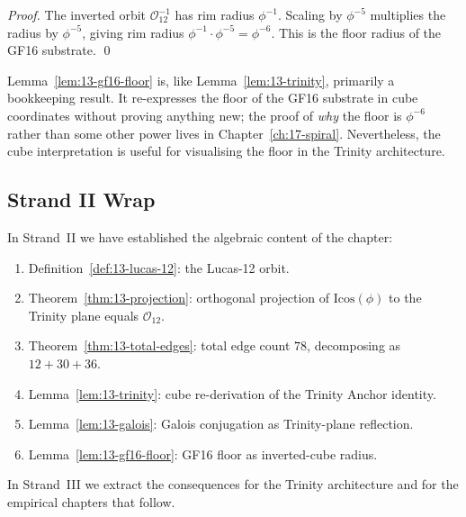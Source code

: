\begin{proof}
The inverted orbit $\mathcal{O}_{12}^{-1}$ has rim radius
$\phi^{-1}$. Scaling by $\phi^{-5}$ multiplies the radius by
$\phi^{-5}$, giving rim radius $\phi^{-1} \cdot \phi^{-5} =
\phi^{-6}$. This is the floor radius of the GF16 substrate. \qed
\end{proof}

\begin{remark}
Lemma~\ref{lem:13-gf16-floor} is, like
Lemma~\ref{lem:13-trinity}, primarily a bookkeeping result. It
re-expresses the floor of the GF16 substrate in cube coordinates
without proving anything new; the proof of \emph{why} the floor is
$\phi^{-6}$ rather than some other power lives in
Chapter~\ref{ch:17-spiral}. Nevertheless, the cube interpretation
is useful for visualising the floor in the Trinity architecture.
\end{remark}

\subsection{Strand II Wrap}
\label{sec:13-strand-II-wrap}

In Strand~II we have established the algebraic content of the
chapter:

\begin{enumerate}
\item Definition~\ref{def:13-lucas-12}: the Lucas-12 orbit.
\item Theorem~\ref{thm:13-projection}: orthogonal projection of
  $\mathrm{Icos}(\phi)$ to the Trinity plane equals
  $\mathcal{O}_{12}$.
\item Theorem~\ref{thm:13-total-edges}: total edge count $78$,
  decomposing as $12 + 30 + 36$.
\item Lemma~\ref{lem:13-trinity}: cube re-derivation of the
  Trinity Anchor identity.
\item Lemma~\ref{lem:13-galois}: Galois conjugation as Trinity-plane
  reflection.
\item Lemma~\ref{lem:13-gf16-floor}: GF16 floor as inverted-cube
  radius.
\end{enumerate}

In Strand~III we extract the consequences for the Trinity
architecture and for the empirical chapters that follow.


